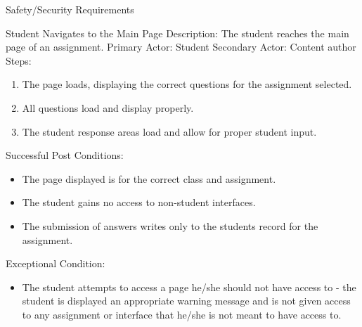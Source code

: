 \documentclass{article}
\begin{document}
\begin{section}{Safety/Security Requirements}

    \begin{subsection}{Student Navigates to the Main Page}
    Description: The student reaches the main page of an assignment. \newline
Primary Actor: Student \newline
Secondary Actor: Content author \newline
Steps:
\begin{enumerate}
\item{The page loads, displaying the correct questions for the assignment selected.}
\item{All questions load and display properly.}
\item{The student response areas load and allow for proper student input.}
\end{enumerate}
Successful Post Conditions:
\begin{itemize}
\item{The page displayed is for the correct class and assignment.}
\item{The student gains no access to non-student interfaces.}
\item{The submission of answers writes only to the students record for the assignment.}
\end{itemize}
Exceptional Condition:
\begin{itemize}
\item {The student attempts to access a page he/she should not have access to - the student is displayed an appropriate warning message and is not given access to any assignment or interface that he/she is not meant to have access to.}
\end{itemize}

\end{subsection}


\end{section}
\end{document}
